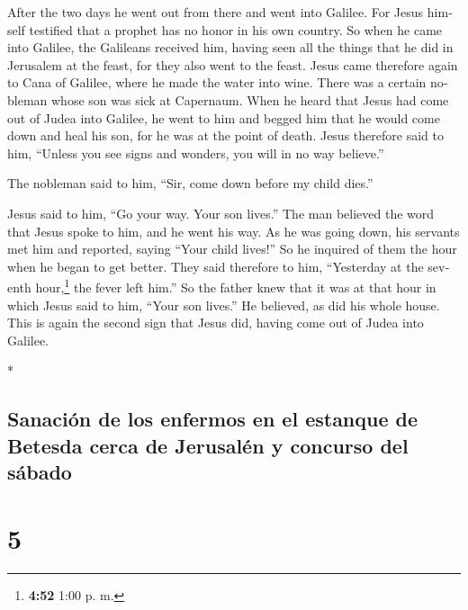 \begin{paracol}{2}
\begin{otherlanguage}{english}
 After the two days he went out from there and went into
Galilee.  For Jesus himself testified that a prophet has
no honor in his own country.  So when he came into
Galilee, the Galileans received him, having seen all the things that he
did in Jerusalem at the feast, for they also went to the feast.
 Jesus came therefore again to Cana of Galilee, where he
made the water into wine. There was a certain nobleman whose son was
sick at Capernaum.  When he heard that Jesus had come out
of Judea into Galilee, he went to him and begged him that he would come
down and heal his son, for he was at the point of death. 
Jesus therefore said to him, ``Unless you see signs and wonders, you
will in no way believe.''

 The nobleman said to him, ``Sir, come down before my
child dies.''

 Jesus said to him, ``Go your way. Your son lives.'' The
man believed the word that Jesus spoke to him, and he went his way.
 As he was going down, his servants met him and reported,
saying ``Your child lives!''  So he inquired of them the
hour when he began to get better. They said therefore to him,
``Yesterday at the seventh hour,\footnote{\textbf{4:52} 1:00 p. m.} the
fever left him.''  So the father knew that it was at that
hour in which Jesus said to him, ``Your son lives.'' He believed, as did
his whole house.  This is again the second sign that
Jesus did, having come out of Judea into Galilee.

\end{otherlanguage}

\switchcolumn[0]*

\hypertarget{sanaciuxf3n-de-los-enfermos-en-el-estanque-de-betesda-cerca-de-jerusaluxe9n-y-concurso-del-suxe1bado}{%
\subsection{Sanación de los enfermos en el estanque de Betesda cerca de
Jerusalén y concurso del
sábado}\label{sanaciuxf3n-de-los-enfermos-en-el-estanque-de-betesda-cerca-de-jerusaluxe9n-y-concurso-del-suxe1bado}}

\hypertarget{section-8}{%
\section{5}\label{section-8}}


\end{paracol}
